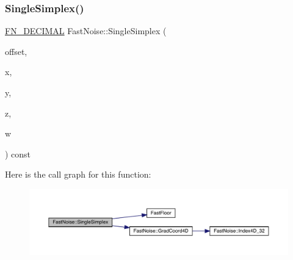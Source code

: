 \subsubsection{\texorpdfstring{Single\+Simplex()}{SingleSimplex()}\hspace{0.1cm}{\footnotesize\ttfamily [3/3]}}
{\footnotesize\ttfamily \mbox{\hyperlink{_fast_noise_8h_a75a9ef6d2541c4921815b885bfd449c3}{F\+N\+\_\+\+D\+E\+C\+I\+M\+AL}} Fast\+Noise\+::\+Single\+Simplex (\begin{DoxyParamCaption}\item[{unsigned char}]{offset,  }\item[{\mbox{\hyperlink{_fast_noise_8h_a75a9ef6d2541c4921815b885bfd449c3}{F\+N\+\_\+\+D\+E\+C\+I\+M\+AL}}}]{x,  }\item[{\mbox{\hyperlink{_fast_noise_8h_a75a9ef6d2541c4921815b885bfd449c3}{F\+N\+\_\+\+D\+E\+C\+I\+M\+AL}}}]{y,  }\item[{\mbox{\hyperlink{_fast_noise_8h_a75a9ef6d2541c4921815b885bfd449c3}{F\+N\+\_\+\+D\+E\+C\+I\+M\+AL}}}]{z,  }\item[{\mbox{\hyperlink{_fast_noise_8h_a75a9ef6d2541c4921815b885bfd449c3}{F\+N\+\_\+\+D\+E\+C\+I\+M\+AL}}}]{w }\end{DoxyParamCaption}) const\hspace{0.3cm}{\ttfamily [private]}}

Here is the call graph for this function\+:
\nopagebreak
\begin{figure}[H]
\begin{center}
\leavevmode
\includegraphics[width=350pt]{class_fast_noise_a1f05efc093f8c7998014dfc3b77e0753_cgraph}
\end{center}
\end{figure}
\mbox{\label{class_fast_noise_aa23a186cee489865781430d344cad11d}} 
